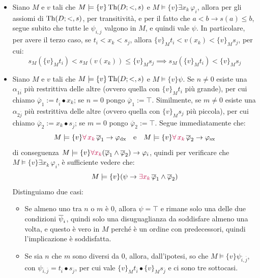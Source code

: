 \begin{soln}
    \begin{itemize}
        \item[$\boxed{\to}$] Siano $M$ e $v$ tali che $M \models \{v\} \operatorname{Th}(D;<,s)$ e $M \models \{v\} \exists x_k \, \varphi_i$, allora per gli assiomi di $\operatorname{Th}(D;<,s)$, per transitività, e per il fatto che $a < b \to s(a) \leq b$, segue subito che tutte le $\psi_{i,j}$ valgono in $M$, e quindi vale $\psi$. In particolare, per avere il terzo caso, se $t_i < x_k < s_j$, allora $\{v\}_M t_i < v(x_k) < \{v\}_M s_j$, per cui:
        \[ s_M(\{v\}_M t_i) < s_M(v(x_k)) \leq \{v\}_M s_j \implies s_M(\{v\}_M t_i) < \{v\}_M s_j \]
        \item[$\boxed{\leftarrow}$] Siano $M$ e $v$ tali che $M \models \{v\} \operatorname{Th}(D;<,s)$ e $M \models \{v\} \psi$. Se $n \ne 0$ esiste una $\alpha_{1\overline i}$ più restrittiva delle altre (ovvero quella con $\{v\}_M t_i$ più grande), per cui chiamo $\overline \varphi_1 := t_{\overline i} \bullet x_k$; se $n = 0$ pongo $\overline \varphi_1 := \top$.
        Similmente, se $m \ne 0$ esiste una $\alpha_{2\overline j}$ più restrittiva delle altre (ovvero quella con $\{v\}_M s_j$ più piccola), per cui chiamo $\overline \varphi_2 := x_k \bullet s_{\overline j}$; se $m = 0$ pongo $\overline \varphi_2 := \top$. Segue immediatamente che:
        \[ M \models \{v\} \textcolor{purple}{\forall \, x_k}\, \overline{\varphi}_1 \to \varphi_{\text{dx}} \quad \text{e} \quad M \models \{v\} \textcolor{purple}{\forall \, x_k}\, \overline{\varphi}_2 \to \varphi_{\text{sx}}
        \]
        di conseguenza $M \models \{v\} \textcolor{purple}{\forall x_k} (\overline{\varphi}_1 \land \overline{\varphi}_2) \to \varphi_i$, quindi per verificare che $M \models \{v\} \exists x_k \, \varphi_i$, è sufficiente vedere che:
        \[ M \models \{v\}( \psi \to \textcolor{purple}{\exists x_k} \, \overline{\varphi}_1 \land \overline{\varphi}_2)
        \]
        Distinguiamo due casi:
        \begin{itemize}
            \item Se almeno uno tra $n$ o $m$ è 0, allora $\psi = \top$ e rimane solo una delle due condizioni $\overline \psi_i$, quindi solo una disuguaglianza da soddisfare almeno una volta, e questo è vero in $M$ perché è un ordine con predecessori, quindi l'implicazione è soddisfatta.
            \item Se sia $n$ che $m$ sono diversi da 0, allora, dall'ipotesi, so che $M \models \{v\} \psi_{\overline i, \overline j}$, con $\psi_{\overline i, \overline j} = t_{\overline i} \bullet s_{\overline j}$, per cui vale $\{v\}_M t_{\overline i} \bullet \{v\}_M s_{\overline j}$ e ci sono tre sottocasi.

\end{itemize}
\end{itemize}
\end{soln}
